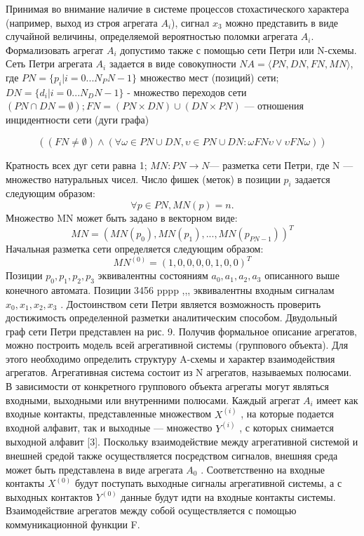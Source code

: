 \documentclass[12pt]{article}
\begin{document}
Принимая во внимание наличие в системе процессов стохастического характера (например, выход
из строя агрегата ${A_i}$), сигнал ${x_3}$ можно представить в виде случайной величины, определяемой вероятностью
поломки агрегата ${A_i}$.
Формализовать агрегат ${A_i}$ допустимо также с помощью сети Петри или N-схемы.
Сеть Петри агрегата ${A_i}$ задается в виде совокупности
$NA =\langle PN,DN,FN,MN \rangle$, где $PN=\{{p_i}|i=0...{N_PN} -1 \}$
множество мест (позиций) сети;
$DN = \{{d_i}|i=0...{N_DN}-1\}$ - множество переходов сети
$(PN \cap DN  = \emptyset); FN=(PN \times DN) \cup (DN \times PN)$
 — отношения инцидентности сети (дуги графа)

\[
((FN \neq \emptyset) \land (\forall \omega \in PN \cup DN, \upsilon \in PN \cup DN : \omega FN \upsilon \vee \upsilon FN \omega))
\]

Кратность всех дуг сети равна 1;
$MN : PN \rightarrow N $— разметка сети Петри, где  N —
множество натуральных чисел.
Число фишек (меток) в позиции ${p_i}$ задается следующим образом:
\[
\forall p \in PN, MN(p) =n.
\]
Множество MN может быть задано в векторном
виде:
\[
	MN = (MN(p_{0}), MN(p_{1}),...,MN(p_{PN-1}))^T
\]
Начальная разметка сети определяется следующим
образом:
\[
	MN^(0)=(1,0,0,0,0,1,0,0)^T
\]
Позиции ${p_0},{p_1},{p_2},{p_3}$ эквивалентны состояниям
 ${a_0},{a_1},{a_2},{a_3}$ описанного выше конечного автомата. Позиции 3456 pppp ,,, эквивалентны входным сигналам
 ${x_0},{x_1},{x_2},{x_3}$ .
Достоинством сети Петри является возможность
проверить достижимость определенной разметки аналитическим способом.
Двудольный граф сети Петри представлен на рис. 9.
Получив формальное описание агрегатов, можно
построить модель всей агрегативной системы (группового объекта). Для этого необходимо определить структуру A-схемы и характер взаимодействия агрегатов.
Агрегативная система состоит из N агрегатов, называемых полюсами. В зависимости от конкретного группового объекта агрегаты могут являться входными, выходными или внутренними полюсами.
Каждый агрегат ${A_i}$ имеет как входные контакты,
представленные множеством $X^(i)$ , на которые подается
входной алфавит, так и выходные — множество $Y^(i)$ ,
с которых снимается выходной алфавит [3].
Поскольку взаимодействие между агрегативной системой и внешней средой также осуществляется посредством сигналов, внешняя среда может быть представлена в виде агрегата ${A_0}$ . Соответственно на входные
контакты $X^(0)$ будут поступать выходные сигналы агрегативной системы, а с выходных контактов $Y^(0)$ данные
будут идти на входные контакты системы. Взаимодействие агрегатов между собой осуществляется с помощью коммуникационной функции F.
\end{document}
